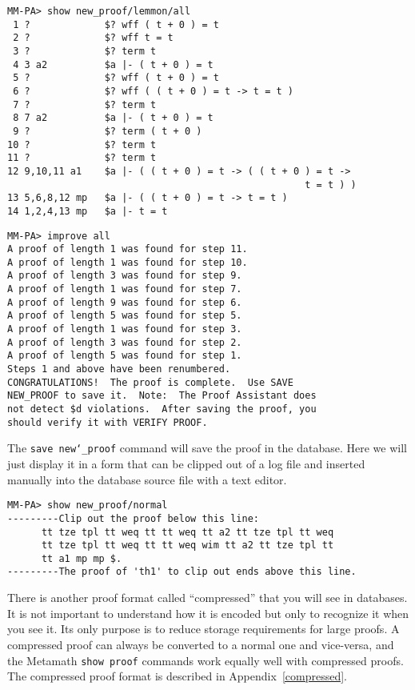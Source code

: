 \begin{verbatim}
MM-PA> show new_proof/lemmon/all
 1 ?             $? wff ( t + 0 ) = t
 2 ?             $? wff t = t
 3 ?             $? term t
 4 3 a2          $a |- ( t + 0 ) = t
 5 ?             $? wff ( t + 0 ) = t
 6 ?             $? wff ( ( t + 0 ) = t -> t = t )
 7 ?             $? term t
 8 7 a2          $a |- ( t + 0 ) = t
 9 ?             $? term ( t + 0 )
10 ?             $? term t
11 ?             $? term t
12 9,10,11 a1    $a |- ( ( t + 0 ) = t -> ( ( t + 0 ) = t ->
                                                    t = t ) )
13 5,6,8,12 mp   $a |- ( ( t + 0 ) = t -> t = t )
14 1,2,4,13 mp   $a |- t = t
\end{verbatim}

\begin{verbatim}
MM-PA> improve all
A proof of length 1 was found for step 11.
A proof of length 1 was found for step 10.
A proof of length 3 was found for step 9.
A proof of length 1 was found for step 7.
A proof of length 9 was found for step 6.
A proof of length 5 was found for step 5.
A proof of length 1 was found for step 3.
A proof of length 3 was found for step 2.
A proof of length 5 was found for step 1.
Steps 1 and above have been renumbered.
CONGRATULATIONS!  The proof is complete.  Use SAVE
NEW_PROOF to save it.  Note:  The Proof Assistant does
not detect $d violations.  After saving the proof, you
should verify it with VERIFY PROOF.
\end{verbatim}

The \texttt{save new{\char`\_}proof} command will save the proof in the database.  Here
we will just display it in a form that can be clipped out of a log file
and inserted manually into the database source file with a text
editor.

\begin{verbatim}
MM-PA> show new_proof/normal
---------Clip out the proof below this line:
      tt tze tpl tt weq tt tt weq tt a2 tt tze tpl tt weq
      tt tze tpl tt weq tt tt weq wim tt a2 tt tze tpl tt
      tt a1 mp mp $.
---------The proof of 'th1' to clip out ends above this line.
\end{verbatim}

There is another proof format called ``compressed'' that you will see in databases.  It is
not important to understand how it is encoded but only to recognize it
when you see it.  Its only purpose is to reduce storage requirements for
large proofs.  A compressed proof can always be converted to a normal
one and vice-versa, and the Metamath \texttt{show proof}
commands work equally well with
compressed proofs.  The compressed proof format is described in
Appendix~\ref{compressed}.


